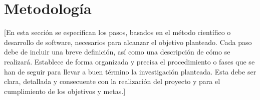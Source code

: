 \section{Metodología}
[En esta sección se especifican los pasos, basados en el método científico o desarrollo de software, necesarios para alcanzar el objetivo planteado. 
Cada paso debe de incluir una breve definición, así como una descripción de cómo se realizará.
Establece de forma organizada y precisa el procedimiento o fases que se han de seguir para llevar a buen término la investigación planteada. 
Esta debe ser  clara, detallada y consecuente con la realización del proyecto y para el cumplimiento de los objetivos y metas.]
